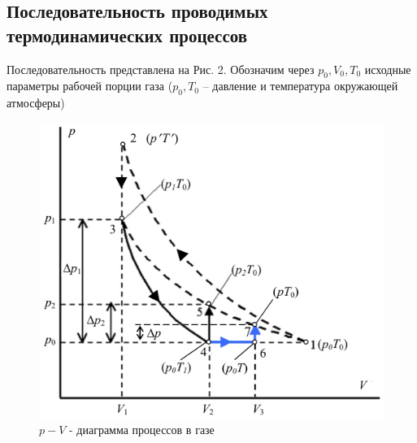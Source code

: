 \documentclass[a4paper,12pt]{article}
\theoremstyle{plain} %
\theoremstyle{definition} %
\theoremstyle{remark} %
\begin{document}
\subsection{Последовательность проводимых термодинамических процессов}
Последовательность представлена на Рис. 2. Обозначим через $p_0, V_0, T_0$ исходные параметры рабочей порции газа ($p_0, T_0$ -- давление и температура окружающей атмосферы)
\begin{figure}[H]
	\begin{center}
		\includegraphics[width=0.7\linewidth]{2}
		\caption{$p-V$ - диаграмма процессов в газе}
	\end{center}
\end{figure}
\end{document}
